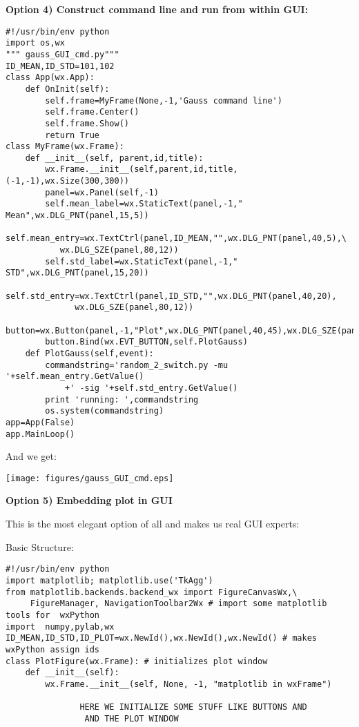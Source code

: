 {{\bf \noindent Option 4)  Construct command line and run from within GUI:}
{\singlespacing \color{blue} \begin{verbatim}
#!/usr/bin/env python
import os,wx
""" gauss_GUI_cmd.py"""
ID_MEAN,ID_STD=101,102
class App(wx.App):
    def OnInit(self):
        self.frame=MyFrame(None,-1,'Gauss command line')
        self.frame.Center()
        self.frame.Show()
        return True 
class MyFrame(wx.Frame):
    def __init__(self, parent,id,title):
        wx.Frame.__init__(self,parent,id,title,(-1,-1),wx.Size(300,300))
        panel=wx.Panel(self,-1)
        self.mean_label=wx.StaticText(panel,-1,"   Mean",wx.DLG_PNT(panel,15,5))
        self.mean_entry=wx.TextCtrl(panel,ID_MEAN,"",wx.DLG_PNT(panel,40,5),\
           wx.DLG_SZE(panel,80,12))
        self.std_label=wx.StaticText(panel,-1,"   STD",wx.DLG_PNT(panel,15,20))
        self.std_entry=wx.TextCtrl(panel,ID_STD,"",wx.DLG_PNT(panel,40,20),
              wx.DLG_SZE(panel,80,12))
        button=wx.Button(panel,-1,"Plot",wx.DLG_PNT(panel,40,45),wx.DLG_SZE(panel,25,12))
        button.Bind(wx.EVT_BUTTON,self.PlotGauss)
    def PlotGauss(self,event):
        commandstring='random_2_switch.py -mu '+self.mean_entry.GetValue()
            +' -sig '+self.std_entry.GetValue()
        print 'running: ',commandstring
        os.system(commandstring)
app=App(False)
app.MainLoop()
\end{verbatim}}

\noindent And we get: 

\texttt{[image: figures/gauss\_GUI\_cmd.eps]} 
 
 


{\bf \noindent Option 5) Embedding plot in GUI}

This is the most elegant option of all and makes us real GUI experts:  

\noindent  Basic Structure:

{\singlespacing \color{blue} \begin{verbatim}
#!/usr/bin/env python
import matplotlib; matplotlib.use('TkAgg')
from matplotlib.backends.backend_wx import FigureCanvasWx,\
     FigureManager, NavigationToolbar2Wx # import some matplotlib tools for  wxPython
import  numpy,pylab,wx
ID_MEAN,ID_STD,ID_PLOT=wx.NewId(),wx.NewId(),wx.NewId() # makes wxPython assign ids
class PlotFigure(wx.Frame): # initializes plot window
    def __init__(self):
        wx.Frame.__init__(self, None, -1, "matplotlib in wxFrame")
        
               HERE WE INITIALIZE SOME STUFF LIKE BUTTONS AND
                AND THE PLOT WINDOW
                

\end{verbatim}}}

